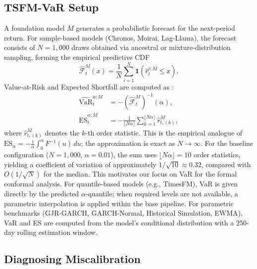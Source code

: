 \documentclass[preprint,11pt,authoryear]{elsarticle}
\newcommand{\VaR}{\mathrm{VaR}}
\newcommand{\ES}{\mathrm{ES}}
\newcommand{\1}{\boldsymbol{1}}
\newcommand{\Fhat}{\hat{\mathcal{F}}}
\begin{document}
	\subsection{TSFM-VaR Setup}
	\label{sec:setup}
	
	A foundation model $M$ generates a probabilistic forecast for
	the next-period return. For sample-based models (Chronos,
	Moirai, Lag-Llama), the forecast consists of $N=1{,}000$ draws
	obtained via ancestral or mixture-distribution sampling,
	forming the empirical predictive CDF
	\[
	\Fhat_t^M(x) = \frac{1}{N}\sum_{i=1}^{N}
	\1(\hat{r}_t^{i;M}\leq x).
	\]
	Value-at-Risk and Expected Shortfall are computed as
	\citep{pele2025llmvar}:
	\begin{align}
		\widehat{\VaR}_t^{\alpha;M}
		&= -(\Fhat_t^M)^{-1}(\alpha), \\
		\widehat{\ES}_t^{\alpha;M}
		&= -\frac{1}{\lfloor N\alpha\rfloor}
		\sum_{k=1}^{\lfloor N\alpha\rfloor}\hat{r}_{t,(k)}^M,
	\end{align}
	where $\hat{r}_{t,(k)}^M$ denotes the $k$-th order statistic.
	This is the empirical analogue of
	$\ES_\alpha = -\frac{1}{\alpha}\int_0^\alpha F^{-1}(u)\,du$;
	the approximation is exact as $N \to \infty$.
	For the baseline configuration ($N = 1{,}000$,
	$\alpha = 0.01$), the sum uses $\lfloor N\alpha \rfloor = 10$
	order statistics, yielding a coefficient of variation of
	approximately $1/\sqrt{10} \approx 0.32$, compared with
	$O(1/\sqrt{N})$ for the median. This motivates our focus on
	VaR for the formal conformal analysis.
	For quantile-based models (e.g., TimesFM), VaR is given
	directly by the predicted $\alpha$-quantile; when required
	levels are not available, a parametric interpolation is applied
	within the base pipeline. For parametric benchmarks
	(GJR-GARCH, GARCH-Normal, Historical Simulation, EWMA), VaR
	and ES are computed from the model's conditional distribution
	with a 250-day rolling estimation window.
	
	\subsection{Diagnosing Miscalibration}
	\label{sec:diag}
	
\end{document}
